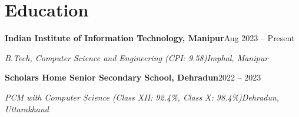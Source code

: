 \documentclass[11pt,letterpaper]{article}
\newcommand{\org}[2]{%
  \vspace{1pt}\noindent\textbf{#1}\hfill {\small #2}\par\nopagebreak%
}
\newcommand{\role}[2]{%
  \noindent\textit{#1}\hfill\textit{\small #2}\par\nopagebreak\vspace{1pt}%
}
\begin{document}
\section*{Education}

\org{Indian Institute of Information Technology, Manipur}{Aug 2023 -- Present}
\role{B.Tech, Computer Science and Engineering (CPI: 9.58)}{Imphal, Manipur}

\org{Scholars Home Senior Secondary School, Dehradun}{2022 -- 2023}
\role{PCM with Computer Science (Class XII: 92.4\%, Class X: 98.4\%)}{Dehradun, Uttarakhand}
\end{document}

